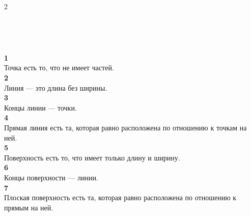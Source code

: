 \documentclass{article}
\begin{document}
\begin{paracol}{2}
 \\
\begin{flushright}

\vspace{12cm}
 \\

\vspace{2cm}

 \\
\end{flushright}

\switchcolumn

\begin{center}
\textbf{1} \\
Точка есть то, что не имеет частей. \\[1em]

\textbf{2} \\
Линия — это длина без ширины. \\[1em]

\textbf{3} \\
Концы линии — точки. \\[1em]

\textbf{4} \\
Прямая линия есть та, которая равно расположена по отношению к точкам на ней. \\[1em]

\textbf{5} \\
Поверхность есть то, что имеет только длину и ширину. \\[1em]

\textbf{6} \\
Концы поверхности — линии. \\[1em]

\textbf{7} \\
Плоская поверхность есть та, которая равно расположена по отношению к прямым на ней. \\[1em]


\end{center}
\end{paracol}
\end{document}
